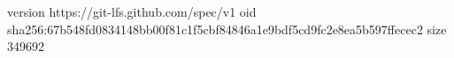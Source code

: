 version https://git-lfs.github.com/spec/v1
oid sha256:67b548fd0834148bb00f81c1f5cbf84846a1e9bdf5cd9fc2e8ea5b597ffecec2
size 349692

